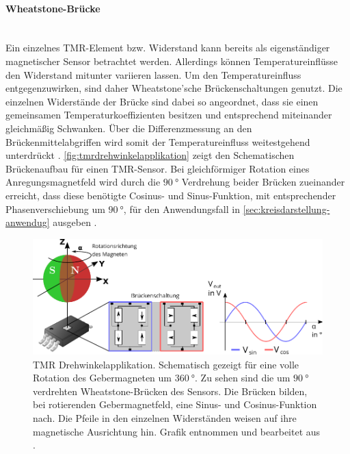 \clearpage

\paragraph{Wheatstone-Brücke}\label{par:wheatstone-bruecke}$~$\\


Ein einzelnes TMR-Element bzw. Widerstand kann bereits als eigenständiger magnetischer Sensor betrachtet werden. Allerdings können Temperatureinflüsse den Widerstand mitunter variieren lassen. Um den Temperatureinfluss entgegenzuwirken, sind daher Wheatstone'sche Brückenschaltungen genutzt. Die einzelnen Widerstände der Brücke sind dabei so angeordnet, dass sie einen gemeinsamen Temperaturkoeffizienten besitzen und entsprechend miteinander gleichmäßig Schwanken. Über die Differenzmessung an den Brückenmittelabgriffen wird somit der Temperatureinfluss weitestgehend unterdrückt \cite{TDK2016}\cite{Tille2020}. \autoref{fig:tmrdrehwinkelapplikation} zeigt den Schematischen Brückenaufbau für einen TMR-Sensor. Bei gleichförmiger Rotation eines Anregungsmagnetfeld wird durch die $\SI{90}{\degree}$ Verdrehung beider Brücken zueinander erreicht, dass diese benötigte Cosinus- und Sinus-Funktion, mit entsprechender Phasenverschiebung um $\SI{90}{\degree}$, für den Anwendungsfall in \autoref{sec:kreisdarstellung-anwendug} ausgeben \cite{TDK2016}. 


\vspace{5mm}
\begin{figure}[tbph]
	\centering
	\includegraphics[width=\linewidth]{chapters/images/TMR_Drehwinkelapplikation}
	\caption[TMR Drehwinkelapplikation]{TMR Drehwinkelapplikation. Schematisch gezeigt für eine volle Rotation des 
		Gebermagneten um $\SI{360}{\degree}$. Zu sehen sind die um $\SI{90}{\degree}$ verdrehten Wheatstone-Brücken des 
		Sensors. Die Brücken bilden, bei rotierenden Gebermagnetfeld, eine Sinus- und Cosinus-Funktion nach. Die Pfeile in 
		den einzelnen Widerständen weisen auf ihre magnetische Ausrichtung hin. Grafik entnommen und bearbeitet aus 
		\cite{Schuethe2020a}.}
	\label{fig:tmrdrehwinkelapplikation}
\end{figure}
